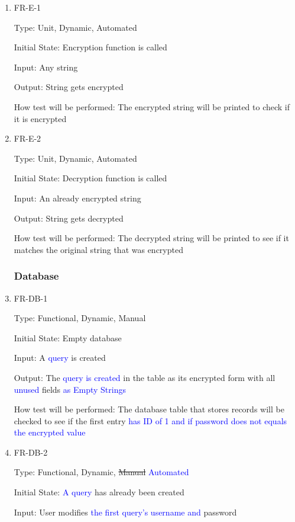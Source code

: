 \documentclass[12pt, titlepage]{article}
\begin{document}
\begin{enumerate}
\item{FR-E-1\\}

Type: Unit, Dynamic, Automated

Initial State: Encryption function is called

Input: Any string

Output: String gets encrypted

How test will be performed: The encrypted string will be printed to check if it is encrypted

\item{FR-E-2\\}

Type: Unit, Dynamic, Automated

Initial State: Decryption function is called

Input: An already encrypted string

Output: String gets decrypted

How test will be performed: The decrypted string will be printed to see if it matches the original string that was encrypted

\subsubsection{Database}

\item{FR-DB-1\\}

Type: Functional, Dynamic, Manual

Initial State: Empty database

Input: A \textcolor{blue}{query} is created

Output: The \textcolor{blue}{query is created} in the table as its encrypted form with all \textcolor{blue}{unused} fields \textcolor{blue}{as Empty Strings}

How test will be performed: The database table that stores records will be checked to see if the first entry \textcolor{blue}{has ID of 1 and if password does not equals the encrypted value}

\item{FR-DB-2\\}

Type: Functional, Dynamic, \sout{Manual} \textcolor{blue}{Automated}

Initial State: \textcolor{blue}{A query} has already been created

Input: User modifies \textcolor{blue}{the first query's username and} password


\end{enumerate}
\end{document}
